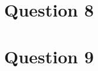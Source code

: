 \documentclass[11pt]{article} %
\begin{document}
\section{Question 8} %

\section{Question 9}
\end{document}
